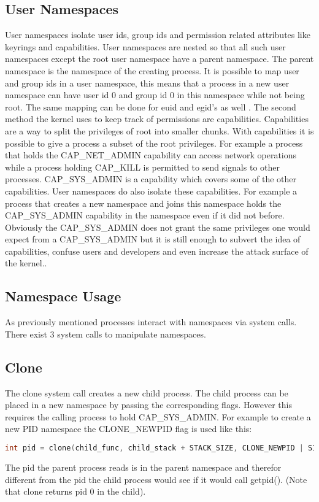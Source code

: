 \documentclass[10pt,twocolumn,a4paper]{article}
\begin{document}
\subsection{User Namespaces}
User namespaces isolate user ids, group ids and permission related attributes like keyrings and
capabilities. User namespaces are nested so that all such user namespaces except the root user namespace
have a parent namespace. The parent namespace is the namespace of the creating process. 
It is possible to map user and group ids in a user namespace, this means that a process in a new user
namespace can have user id 0 and group id 0 in this namespace while not being root. The same mapping
can be done for euid and egid's as well \cite{18}. The second method the kernel uses to keep track
of permissions are capabilities. Capabilities are a way to split the privileges of root into smaller
chunks. With capabilities it is possible to give a process a subset of the root
privileges. For example a process that holds the CAP\_NET\_ADMIN capability can access network
operations while a process holding CAP\_KILL is permitted to send signals to other
processes\cite{19}. CAP\_SYS\_ADMIN is a capability which covers some of the
other capabilities. 
User namespaces do also isolate these capabilities. For example a process that creates a new
namespace and joins this namespace holds the CAP\_SYS\_ADMIN capability in the namespace even if it did not before. Obviously the CAP\_SYS\_ADMIN does not grant the same privileges one would expect from
a  CAP\_SYS\_ADMIN but it is still enough to subvert the idea of capabilities, confuse users and
developers and even increase the attack surface of the kernel.\cite{20}. 

\subsection{Namespace Usage}
As previously mentioned processes interact with namespaces via system calls. There exist 3 system calls
to manipulate namespaces. 
\subsection{ Clone}
The clone system call creates a new child process. The child process can be placed in a new
namespace by passing the corresponding flags. However this requires the calling process to hold
CAP\_SYS\_ADMIN. For example to create a new PID namespace the CLONE\_NEWPID flag is used like this:
\begin{lstlisting}[language=C]
    int pid = clone(child_func, child_stack + STACK_SIZE, CLONE_NEWPID | SIGCHLD, NULL);
\end{lstlisting}
The pid the parent process reads is in the parent namespace and therefor different from the pid the
child process would see if it would call getpid(). (Note that clone returns pid 0 in the
child)\cite{22}.
\end{document}
